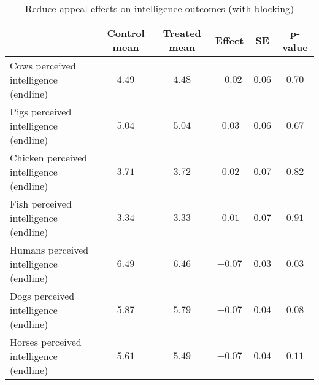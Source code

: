 \begin{table*}[ht]
\caption{Reduce appeal effects on intelligence outcomes (with blocking)\label{round}} 
\begin{center}
\begin{tabular}{lccccc}
\hline\hline
\multicolumn{1}{l}{}&\multicolumn{1}{c}{Control mean}&\multicolumn{1}{c}{Treated mean}&\multicolumn{1}{c}{Effect}&\multicolumn{1}{c}{SE}&\multicolumn{1}{c}{p-value}\tabularnewline
\hline
Cows perceived intelligence (endline)&$4.49$&$4.48$&$-0.02$&$0.06$&$0.70$\tabularnewline
Pigs perceived intelligence (endline)&$5.04$&$5.04$&$~0.03$&$0.06$&$0.67$\tabularnewline
Chicken perceived intelligence (endline)&$3.71$&$3.72$&$~0.02$&$0.07$&$0.82$\tabularnewline
Fish perceived intelligence (endline)&$3.34$&$3.33$&$~0.01$&$0.07$&$0.91$\tabularnewline
Humans perceived intelligence (endline)&$6.49$&$6.46$&$-0.07$&$0.03$&$0.03$\tabularnewline
Dogs perceived intelligence (endline)&$5.87$&$5.79$&$-0.07$&$0.04$&$0.08$\tabularnewline
Horses perceived intelligence (endline)&$5.61$&$5.49$&$-0.07$&$0.04$&$0.11$\tabularnewline
\hline
\end{tabular}\end{center}

\end{table*}
